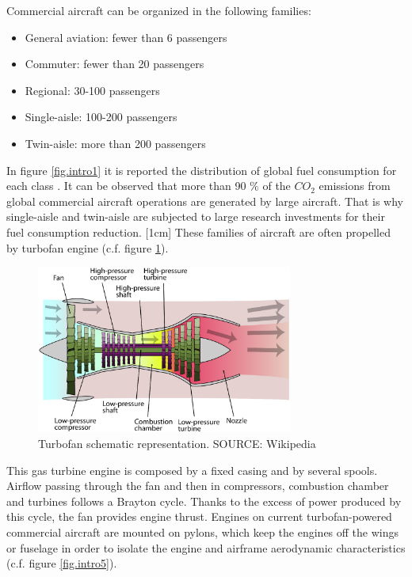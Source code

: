 Commercial aircraft can be organized in the following families:
\begin{itemize}
\item General aviation: fewer than 6 passengers
\item Commuter: fewer than 20 passengers
\item Regional: 30-100 passengers
\item Single-aisle: 100-200 passengers 
\item Twin-aisle: more than 200 passengers
\end{itemize}
In figure \ref{fig.intro1} it is reported the distribution of global fuel consumption for each class \cite{yutko2011approaches}. It can be observed that more than 90 $\%$ of the $CO_2$ emissions from global commercial aircraft operations are generated by large aircraft. 
That is why single-aisle and twin-aisle are subjected to large research investments for their fuel consumption reduction.
[1cm]
These families of aircraft are often propelled by turbofan engine (c.f. figure \ref{fig.intro2}).
\begin{figure}[!ht]
\centering   
 \includegraphics[width=0.75\textwidth]{images/intro/Turbofan_operation}
     \caption{Turbofan schematic representation. SOURCE: Wikipedia}
     \label{fig.intro2}
\end{figure}
This gas turbine engine is composed by a fixed casing and by several spools. Airflow passing through the fan and then in compressors, combustion chamber and turbines follows a Brayton cycle. Thanks to the excess of power produced by this cycle, the fan provides engine thrust. 
Engines on current turbofan-powered commercial aircraft are mounted on pylons, which keep the engines off the wings or fuselage in order to isolate the engine and airframe aerodynamic characteristics (c.f. figure \ref{fig.intro5}).
